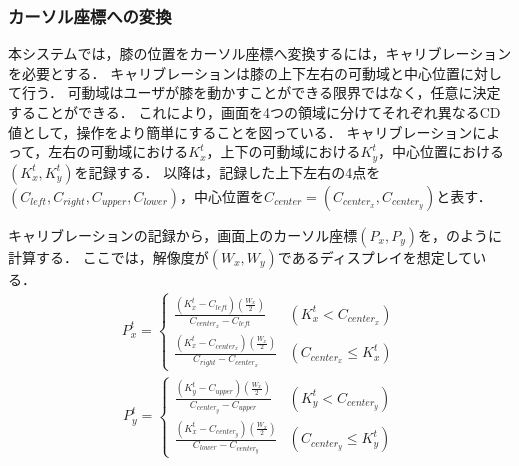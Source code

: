 \documentclass[submit, techrep]{ipsj}
\begin{document}
\subsubsection{カーソル座標への変換}
本システムでは，膝の位置をカーソル座標へ変換するには，キャリブレーションを必要とする．
キャリブレーションは膝の上下左右の可動域と中心位置に対して行う．
可動域はユーザが膝を動かすことができる限界ではなく，任意に決定することができる．
これにより，画面を4つの領域に分けてそれぞれ異なるCD値として，操作をより簡単にすることを図っている．
キャリブレーションによって，左右の可動域における$K^t_x$，上下の可動域における$K^t_y$，中心位置における$(K^t_x, K^t_y)$を記録する．
以降は，記録した上下左右の4点を$(C_{left},C_{right},C_{upper},C_{lower})$，中心位置を$C_{center}=(C_{center_x},  C_{center_y})$と表す．\par
キャリブレーションの記録から，画面上のカーソル座標$(P_x, P_y)$を，のように計算する．
ここでは，解像度が$(W_x, W_y)$であるディスプレイを想定している．
\begin{eqnarray}
	\label{eq:calc_px}
	P^t_x = 
	\begin{cases}
		\frac{(K^t_x - C_{left}) \left( \frac{W_x}{2} \right)}{C_{center_x} - C_{left}} & (K^t_x < C_{center_x})\\
		\frac{(K^t_x - C_{center_x}) \left( \frac{W_x}{2} \right)}{C_{right} - C_{center_x}} & (C_{center_x} \leq K^t_x)
	\end{cases}	 
\end{eqnarray}
\begin{eqnarray}
	\label{eq:calc_py}
	P^t_y = 
	\begin{cases}
		\frac{(K^t_y - C_{upper}) \left( \frac{W_x}{2} \right)}{C_{center_y} - C_{upper}} & (K^t_y < C_{center_y}) \\
		\frac{(K^t_x - C_{center_y}) \left( \frac{W_x}{2} \right)}{C_{lower} - C_{center_y}} & (C_{center_y} \leq K^t_y)
	\end{cases}
\end{eqnarray}
\end{document}
